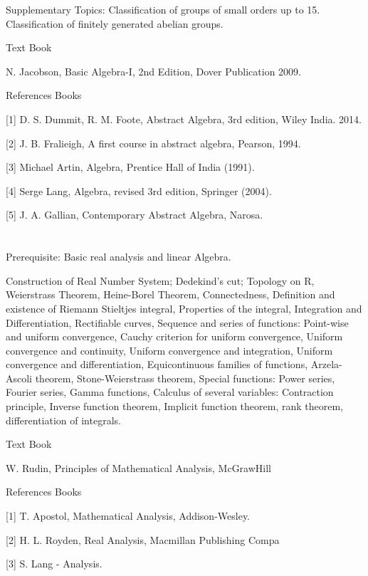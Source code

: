 Supplementary Topics: Classification of groups of small orders up to 15. Classification of finitely generated abelian groups. 

Text Book

N. Jacobson, Basic Algebra-I, 2nd Edition, Dover Publication 2009.

References Books

[1] D. S. Dummit, R. M. Foote, Abstract Algebra, 3rd edition, Wiley India. 2014.

[2] J. B. Fralieigh, A first course in abstract algebra, Pearson, 1994.

[3] Michael Artin, Algebra, Prentice Hall of India (1991).

[4] Serge Lang, Algebra, revised 3rd edition, Springer (2004).

[5] J. A. Gallian, Contemporary Abstract Algebra, Narosa.


\section{\courseinfo}

Prerequisite: Basic real analysis and linear Algebra.  

Construction of Real Number System; Dedekind's cut; Topology on R, Weierstrass Theorem, Heine-Borel Theorem, Connectedness, Definition and existence of Riemann Stieltjes integral, Properties  of the integral, Integration and Differentiation, Rectifiable curves, Sequence and series of functions: Point-wise and uniform convergence, Cauchy criterion for uniform convergence,  Uniform convergence and continuity, Uniform convergence and integration, Uniform convergence and differentiation, Equicontinuous families of functions, Arzela-Ascoli theorem, Stone-Weierstrass theorem, Special functions: Power series, Fourier series, Gamma functions, Calculus of several variables: Contraction principle, Inverse function theorem, Implicit function theorem, rank theorem, differentiation of integrals.

Text Book

W. Rudin, Principles of Mathematical Analysis, McGrawHill

References Books

[1] T. Apostol, Mathematical Analysis, Addison-Wesley.

[2] H. L. Royden, Real Analysis, Macmillan Publishing Compa

[3] S. Lang - Analysis.


